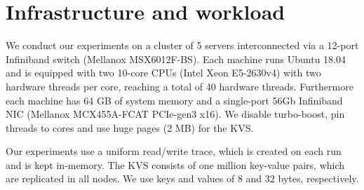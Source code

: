 \section{Infrastructure and workload}
\label{sec:meth}


We conduct our experiments on a cluster of 5 servers interconnected via a 12-port Infiniband switch (Mellanox MSX6012F-BS). Each machine runs Ubuntu 18.04 and is equipped with two 10-core CPUs (Intel Xeon E5-2630v4) with two hardware threads per core, reaching a total of 40 hardware threads. 
Furthermore each machine has 64 GB of system memory and a single-port 56Gb Infiniband NIC (Mellanox MCX455A-FCAT PCIe-gen3 x16). %
We disable turbo-boost, pin threads to cores and use huge pages (2 MB) for the KVS. 

Our experiments use a uniform read/write trace, which is created on each run and is kept in-memory.
The KVS consists of one million key-value pairs, which are replicated in all nodes. We use keys and values of $8$ and $32$ bytes, respectively. 


